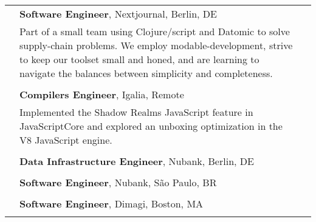 \documentclass[10pt]{article}
\makeatletter
\renewcommand{\labelitemi}{$\cdot$}
\newenvironment{packeditem}{
\vspace{-5mm}
\begin{itemize}[leftmargin=*,labelindent=8pt]
  \renewcommand{\labelitemi}{$\diamond$}
  \setlength{\itemsep}{1pt}
  \setlength{\parskip}{0pt}
  \setlength{\parsep}{0pt}
}{\end{itemize}}
\newcommand{\category}[2]{
\begin{center}
\vskip 6pt
\begin{tabular*}{\textwidth}{@{}p{0.75in}@{\quad\;\;}p{4in}@{\quad\quad}p{0.7in}}
\vcrush[t]{1in}{\textsc{#1}} &
#2
\end{tabular*}
\end{center}
}
\newcommand{\n}{\\ & }
\newcommand{\conf}[1]{&\hspace{\stretch 1}\crushr{\textit{#1}}}
\makeatother
\begin{document}
\category{Experience}{
{\bf Software Engineer}, Nextjournal, Berlin, DE\conf{2022 -- }\n
Part of a small team using Clojure/script and Datomic to solve supply-chain problems. We employ modable-development, strive to keep our toolset small and honed, and are learning to navigate the balances between simplicity and completeness.\n\n

{\bf Compilers Engineer}, Igalia, Remote\conf{Aug. -- Dec. 2021}\n
Implemented the Shadow Realms JavaScript feature in JavaScriptCore and explored an unboxing optimization in the V8 JavaScript engine.\n\n

{\bf Data Infrastructure Engineer}, Nubank, Berlin, DE\conf{2017 -- 2021}\n
\begin{packeditem}
\item \emph{Data infrastructure:} Innovating over our ETL for Datomic-backed services and developing data processing tools used by hundreds of internal clients.
\item \emph{Testing frameworks:} Maintainer of several key testing tools at Nubank.
\item \emph{Technical lead:} Set technical priorities for a small team focused on data ingestion and publishing.
\end{packeditem}\n

{\bf Software Engineer}, Nubank, S\~{a}o Paulo, BR \conf{Feb. -- Oct. 2017}\n
\begin{packeditem}
\item \emph{Microservices:} Build and maintain microservices in Clojure for a mobile-driven credit card product
\item \emph{Engineering productivity:} Build tools and improve core Clojure libraries to boost the eﬃciency of a 100+ engineering team.
\end{packeditem}\n

{\bf Software Engineer}, Dimagi, Boston, MA \conf{2015 -- 2017}\n
\begin{packeditem}
\item \emph{CommCare:} improved stability and performance of an Android app used by tens of thousands of users world-wide. Implemented new features for users with low tech literacy.
\item \emph{Tests:} established unit-level Robolectric and UI-level Calabash test systems for Android. Built an integration test-suite between mobile and server apps. Setup cross-repository CI system.
\item \emph{Legacy code:} performed substantial refactors on a 5-year-old production legacy codebase. Migrated from Java 3 to 8 and from the Ant to Gradle build system.
\item \emph{User empathy:} Worked with users to make development in the CommCare app building platform more approachable and efficient.
\end{packeditem}

}
\end{document}
